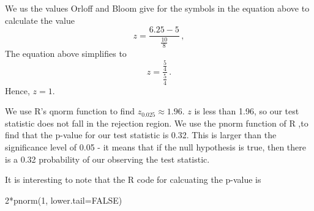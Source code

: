 \documentclass[a5paper,11pt]{article}
\begin{document}
We us the values Orloff and Bloom give for the symbols in the equation above 
to calculate the value
\begin{equation}
z=\frac{6.25 -5}{\frac{10}{8}}\,,
\end{equation} 
The equation above simplifies to 
\begin{equation}
z=\frac{\frac{5}{4}}{\frac{5}{4}}\,.
\end{equation}
Hence, $z=1$.

We use R's qnorm function to find $z_0.025 \approx 1.96$.  $z$ is less than
1.96, so our test statistic does not fall in the rejection region.  We use
the pnorm function of R \cite{rTut2Tail},to find that the p-value for our 
test statistic is 0.32.  This is larger than the significance level
of 0.05 - it means that if the null hypothesis is true, then there
is a 0.32 probability of our observing the test statistic.

It is interesting to note that the R code for calcuating the p-value is
\begin{lstlist}
2*pnorm(1, lower.tail=FALSE)
\end{lstlist}
\printbibliography{}
\end{document}
